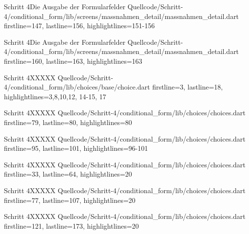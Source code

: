   \begin{alexlisting}{Schritt 4}{Die Ausgabe der Formularfelder}
    {Quellcode/Schritt-4/conditional_form/lib/screens/massnahmen_detail/massnahmen_detail.dart}
    {firstline=147, lastline=156, highlightlines={151-156}}
    \label{lst:Schritt4XXXXX}
  \end{alexlisting}

  \begin{alexlisting}{Schritt 4}{Die Ausgabe der Formularfelder}
    {Quellcode/Schritt-4/conditional_form/lib/screens/massnahmen_detail/massnahmen_detail.dart}
    {firstline=160, lastline=163, highlightlines={163}}
    \label{lst:Schritt4XXXXX}
  \end{alexlisting}

  \begin{alexlisting}{Schritt 4}{XXXXX}
    {Quellcode/Schritt-4/conditional_form/lib/choices/base/choice.dart}
    {firstline=3, lastline=18, highlightlines={3,8,10,12, 14-15, 17 }}
    \label{lst:Schritt4XXXXX}
  \end{alexlisting}

  \begin{alexlisting}{Schritt 4}{XXXXX}
    {Quellcode/Schritt-4/conditional_form/lib/choices/choices.dart}
    {firstline=79, lastline=80, highlightlines={80}}
    \label{lst:Schritt4XXXXX}
  \end{alexlisting}

  \begin{alexlisting}{Schritt 4}{XXXXX}
    {Quellcode/Schritt-4/conditional_form/lib/choices/choices.dart}
    {firstline=95, lastline=101, highlightlines={96-101}}
    \label{lst:Schritt4XXXXX}
  \end{alexlisting}

  \begin{alexlisting}{Schritt 4}{XXXXX}
    {Quellcode/Schritt-4/conditional_form/lib/choices/choices.dart}
    {firstline=33, lastline=64, highlightlines={20}}
    \label{lst:Schritt4XXXXX}
  \end{alexlisting}

  \begin{alexlisting}{Schritt 4}{XXXXX}
    {Quellcode/Schritt-4/conditional_form/lib/choices/choices.dart}
    {firstline=77, lastline=107, highlightlines={20}}
    \label{lst:Schritt4XXXXX}
  \end{alexlisting}


  \begin{alexlisting}{Schritt 4}{XXXXX}
    {Quellcode/Schritt-4/conditional_form/lib/choices/choices.dart}
    {firstline=121, lastline=173, highlightlines={20}}
    \label{lst:Schritt4XXXXX}
  \end{alexlisting}